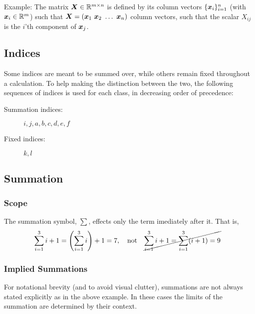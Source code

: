 \documentclass[Thesis.tex]{subfiles}
\begin{document}
Example: The matrix $\bm{X}\in\mathbb{R}^{m\times n}$ is defined by its column
vectors $\{\bm{x}_i\}_{i=1}^n$ (with $\bm{x}_i\in\mathbb{R}^{m}$) such that $ \bm{X} =
(\bm{x}_1\ \bm{x}_2\ \dots\ \bm{x}_n)$ column vectors, such that the scalar $X_{ij}$ is
the $i$'th component of $\bm{x}_j$.

\subsection{Indices}

Some indices are meant to be summed over, while others remain fixed throughout a
calculation. To help making the distinction between the two, the following
sequences of indices is used for each class, in decreasing order of
precedence:

\begin{description}
\item[Summation indices:] $i, j, a, b, c, d, e, f$
\item[Fixed indices:] $k, l$
\end{description}

\subsection{Summation}

\subsubsection{Scope}

The summation symbol, $\sum$, effects only the term imediately after it. That
is,
\begin{align}
  \sum_{i=1}^3 i + 1 = \qty(\sum_{i=1}^3 i) + 1 = 7, \qq{not} \cancel{\sum_{i=1}^3i + 1 = \sum_{i=1}^3(i + 1) = 9}
\end{align}

\subsubsection{Implied Summations}

For notational brevity (and to avoid visual clutter), summations are not always
stated explicitly as in the above example. In these cases the limits of the
summation are determined by their context.
\end{document}
